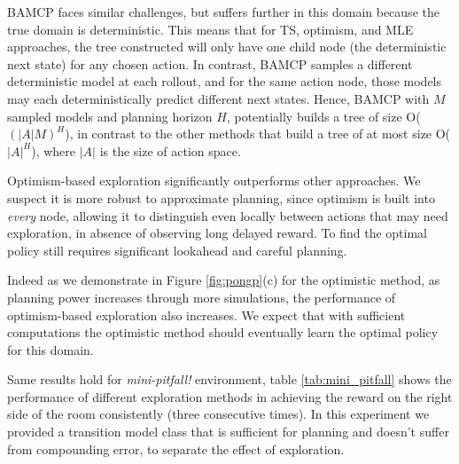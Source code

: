 BAMCP faces similar challenges, but suffers further in this domain because the true domain is deterministic. This means that for TS, optimism, and MLE approaches, the tree constructed will only have one child node (the deterministic next state) for any chosen action. In contrast, BAMCP samples a different deterministic model at each rollout, and for the same action node, those models may each deterministically predict different next states. Hence, BAMCP with $M$ sampled models and planning horizon $H$, potentially builds a tree of size O($(|A|M)^H$), in contrast to the other methods that build a tree of at most size O($|A|^H$), where $|A|$ is the size of action space. 

Optimism-based exploration significantly outperforms other approaches. We suspect it is more robust to approximate planning, since optimism is built into \textit{every} node, allowing it to distinguish even locally between actions that may need exploration, in absence of observing long delayed reward. To find the optimal policy still requires significant lookahead and careful planning. 

Indeed as we demonstrate in Figure \ref{fig:pongp}(c) for the optimistic method, as planning power increases through more simulations, the performance of optimism-based exploration also increases. We expect that with sufficient computations the optimistic method should eventually learn the optimal policy for this domain. 

Same results hold for \textit{mini-pitfall!} environment, table \ref{tab:mini_pitfall} shows the performance of different exploration methods in achieving the reward on the right side of the room consistently (three consecutive times). In this experiment we provided a transition model class that is sufficient for planning and doesn't suffer from compounding error, to separate the effect of exploration. 






